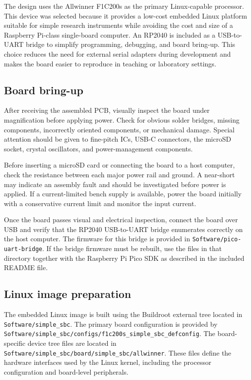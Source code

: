 The design uses the Allwinner F1C200s as the primary Linux-capable processor. 
This device was selected because it provides a low-cost embedded Linux 
platform suitable for simple research instruments while avoiding the cost 
and size of a Raspberry Pi-class single-board computer. An RP2040 is 
included as a USB-to-UART bridge to simplify programming, debugging, and 
board bring-up. This choice reduces the need for external serial adapters 
during development and makes the board easier to reproduce in teaching or 
laboratory settings.

\subsection{Board bring-up}

After receiving the assembled PCB, visually inspect the board under 
magnification before applying power. Check for obvious solder bridges, 
missing components, incorrectly oriented components, or mechanical damage. 
Special attention should be given to fine-pitch ICs, USB-C connectors, the 
microSD socket, crystal oscillators, and power-management components.

Before inserting a microSD card or connecting the board to a host computer, 
check the resistance between each major power rail and ground. A near-short 
may indicate an assembly fault and should be investigated before power is 
applied. If a current-limited bench supply is available, power the board 
initially with a conservative current limit and monitor the input current.

Once the board passes visual and electrical inspection, connect the board 
over USB and verify that the RP2040 USB-to-UART bridge enumerates 
correctly on the host computer. The firmware for this bridge is 
provided in \texttt{Software/pico-uart-bridge}. If the bridge firmware 
must be rebuilt, use the files in that directory together with the 
Raspberry Pi Pico SDK as described in the included README file.

\subsection{Linux image preparation}

The embedded Linux image is built using the Buildroot external tree 
located in \texttt{Software/simple_sbc}. The primary board configuration 
is provided by \texttt{Software/simple_sbc/configs/f1c200s_simple_sbc_defconfig}. 
The board-specific device tree files are located in 
\texttt{Software/simple_sbc/board/simple_sbc/allwinner}. These files define the 
hardware interfaces used by the Linux kernel, including the processor configuration 
and board-level peripherals.

